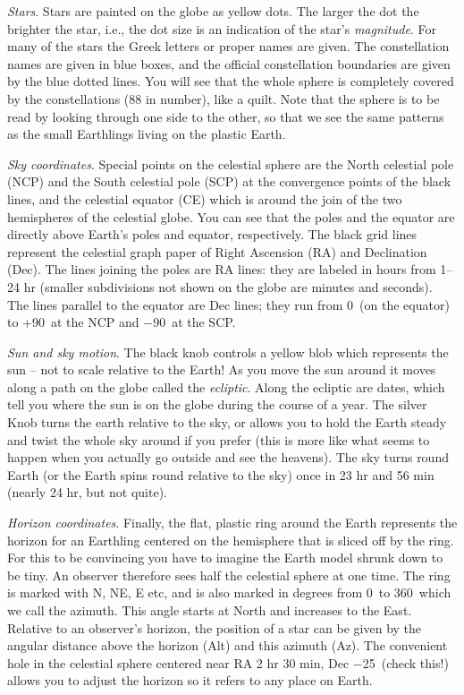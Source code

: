 \documentclass[12pt]{article}
\begin{document}
\medskip\noindent
\emph{Stars}. Stars are painted on the globe as yellow dots. The
larger the dot the brighter the star, i.e., the dot size is an
indication of the star's \emph{magnitude}. For many of the stars the
Greek letters or proper names are given.  The constellation names are
given in blue boxes, and the official constellation boundaries are
given by the blue dotted lines. You will see that the whole sphere is
completely covered by the constellations (88 in number), like a
quilt. Note that the sphere is to be read by looking through one side
to the other, so that we see the same patterns as the small Earthlings
living on the plastic Earth.

\medskip\noindent
\emph{Sky coordinates}. Special points on the celestial sphere are the
North celestial pole (NCP) and the South celestial pole (SCP) at the
convergence points of the black lines, and the celestial equator (CE)
which is around the join of the two hemispheres of the celestial
globe. You can see that the poles and the equator are directly above
Earth's poles and equator, respectively.  The black grid lines
represent the celestial graph paper of Right Ascension (RA) and
Declination (Dec). The lines joining the poles are RA lines: they are
labeled in hours from 1--24 hr (smaller subdivisions not shown on the
globe are minutes and seconds). The lines parallel to the equator are
Dec lines; they run from 0\deg\ (on the equator) to +90\deg\ at the
NCP and $-$90\deg\ at the SCP.

\medskip\noindent
\emph{Sun and sky motion}.  The black knob controls a yellow blob
which represents the sun -- not to scale relative to the Earth! As you
move the sun around it moves along a path on the globe called the
\emph{ecliptic}. Along the ecliptic are dates, which tell you where
the sun is on the globe during the course of a year. The silver Knob
turns the earth relative to the sky, or allows you to hold the Earth
steady and twist the whole sky around if you prefer (this is more like
what seems to happen when you actually go outside and see the
heavens). The sky turns round Earth (or the Earth spins round relative
to the sky) once in 23 hr and 56 min (nearly 24 hr, but not quite).

\medskip\noindent
\emph{Horizon coordinates}.
Finally, the flat, plastic ring around the Earth represents the horizon for
an Earthling centered on the hemisphere that is sliced off by the
ring. For this to be convincing you have to imagine the Earth model
shrunk down to be tiny. An observer therefore sees half the celestial
sphere at one time. The ring is marked with N, NE, E etc, and is also
marked in degrees from 0\deg\ to 360\deg\ which we call the
azimuth. This angle starts at North and increases to the
East. Relative to an observer's horizon, the position of a star can be
given by the angular distance above the horizon (Alt) and this azimuth
(Az). The convenient hole in the celestial sphere centered near RA 2
hr 30 min, Dec $-$25\deg\ (check this!) allows you to adjust the
horizon so it refers to any place on Earth.
\end{document}
